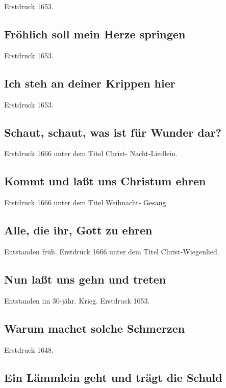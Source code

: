 Erstdruck 1653.

\subsection*{ Fröhlich soll mein Herze springen}

Erstdruck 1653.

\subsection*{ Ich steh an deiner Krippen hier}

Erstdruck 1653.

\subsection*{ Schaut, schaut, was ist für Wunder dar?}

Erstdruck 1666 unter dem Titel \frqq Christ- Nacht-Liedlein\flqq .

\subsection*{ Kommt und laßt uns Christum ehren}

Erstdruck 1666 unter dem Titel \frqq Weihnacht- Gesang\flqq .

\subsection*{ Alle, die ihr, Gott zu ehren}

Entstanden früh. Erstdruck 1666 unter dem Titel \frqq Christ-Wiegenlied\flqq .

\subsection*{ Nun laßt uns gehn und treten}

Entstanden im 30-jähr. Krieg. Erstdruck 1653.

\subsection*{ Warum machet solche Schmerzen}

Erstdruck 1648.

\subsection*{ Ein Lämmlein geht und trägt die Schuld}

